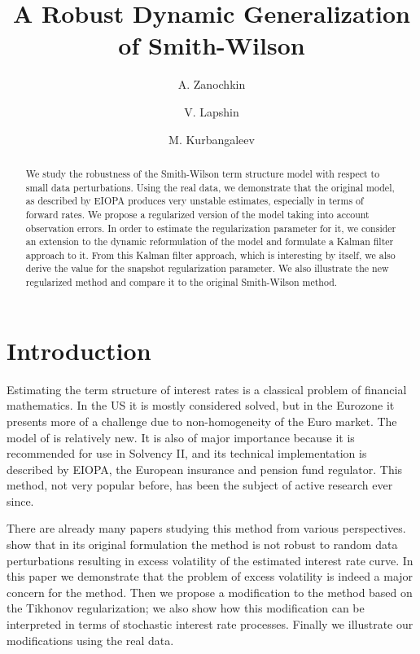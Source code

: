 \documentclass[a4paper]{iccf2017}
\title{A Robust Dynamic Generalization of Smith-Wilson}{A Robust Dynamic Generalization of the Smith-Wilson Term Structure Model}
\author{A. Zanochkin}{Andrey Zanochkin}
\author{V. Lapshin}{Victor Lapshin}
\author{M. Kurbangaleev}{Marat Kurbangaleev}%
\begin{document}
\maketitle

\begin{abstract}
We study the robustness of the Smith-Wilson term structure model with respect to small data perturbations. Using the real data, we demonstrate that the original model, as described by EIOPA produces very unstable estimates, especially in terms of forward rates. We propose a regularized version of the model taking into account observation errors. In order to estimate the regularization parameter for it, we consider an extension to the dynamic reformulation of the model and formulate a Kalman filter approach to it. From this Kalman filter approach, which is interesting by itself, we also derive the value for the snapshot regularization parameter. We also illustrate the new regularized method and compare it to the original Smith-Wilson method.
\end{abstract}

\section{Introduction}
Estimating the term structure of interest rates is a classical problem of financial mathematics. In the US it is mostly considered solved, but in the Eurozone it presents more of a challenge due to non-homogeneity of the Euro market. The model of \cite{Smith_Wilson} is relatively new. It is also of major importance because it is recommended for use in Solvency II, and its technical implementation is described by EIOPA, the European insurance and pension fund regulator. This method, not very popular before, has been the subject of active research ever since.

There are already many papers studying this method from various perspectives. \cite{Hibbert,kocken2012dangerous} show that in its original formulation the method is not robust to random data perturbations resulting in excess volatility of the estimated interest rate curve. In this paper we demonstrate that the problem of excess volatility is indeed a major concern for the method. Then we propose a modification to the method based on the Tikhonov regularization; we also show how this modification can be interpreted in terms of stochastic interest rate processes. Finally we illustrate our modifications using the real data.
\end{document}
